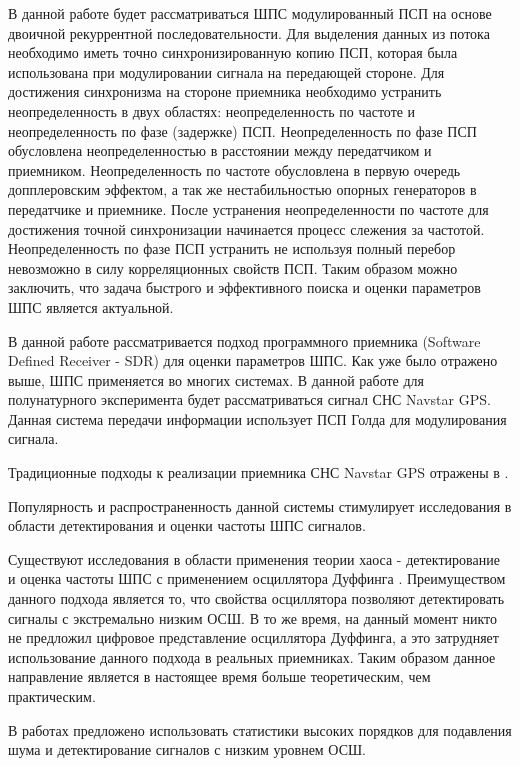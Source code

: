 В данной работе будет рассматриваться ШПС модулированный ПСП на основе двоичной рекуррентной последовательности.
Для выделения данных из потока необходимо иметь точно синхронизированную копию ПСП, которая была использована
при модулировании сигнала на передающей стороне. Для достижения синхронизма на стороне приемника необходимо
устранить неопределенность в двух областях: неопределенность по частоте и неопределенность по фазе (задержке) ПСП.
Неопределенность по фазе ПСП обусловлена неопределенностью в расстоянии между передатчиком и приемником. Неопределенность
по частоте обусловлена в первую очередь допплеровским эффектом, а так же нестабильностью опорных генераторов в
передатчике и приемнике. После устранения неопределенности по частоте для достижения точной синхронизации
начинается процесс слежения за частотой. Неопределенность по фазе ПСП устранить не используя полный перебор
невозможно в силу корреляционных свойств ПСП. Таким образом можно заключить, что задача быстрого и эффективного
поиска и оценки параметров ШПС является актуальной.

В данной работе рассматривается подход программного приемника (Software Defined Receiver - SDR)
\cite{akos-book, grayver-book, pany-book} для оценки параметров ШПС. Как уже было отражено выше, ШПС применяется во
многих системах. В данной работе для полунатурного эксперимента будет рассматриваться сигнал СНС Navstar GPS. Данная система передачи 
информации использует ПСП Голда \cite{gold-ieee} для модулирования сигнала.

Традиционные подходы к реализации приемника СНС Navstar GPS отражены в \cite{akos-book, tsui}. 

Популярность и распространенность данной системы стимулирует исследования в области детектирования
и оценки частоты ШПС сигналов.

Существуют исследования в области применения теории хаоса - детектирование и оценка
частоты ШПС с применением осциллятора Дуффинга \cite{chaos_cambridge, chaos_chen, chaos_huang, chaos_wang}. Преимуществом
данного подхода является то, что свойства осциллятора позволяют детектировать сигналы с экстремально низким ОСШ. В то же
время, на данный момент никто не предложил цифровое представление осциллятора Дуффинга, а это затрудняет использование данного подхода
в реальных приемниках. Таким образом данное направление является в настоящее время больше теоретическим, чем практическим.

В работах \cite{hos_petropulu, hos_zhao} предложено использовать статистики высоких порядков для подавления шума и детектирование
сигналов с низким уровнем ОСШ.

